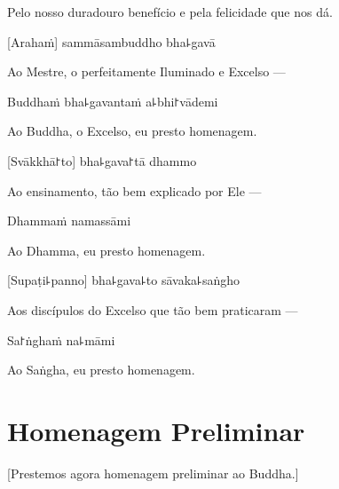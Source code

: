 \begin{english}
Pelo nosso duradouro benefício e pela felicidade que nos dá.
\end{english}

\clearpage

[Arahaṁ] sammāsambuddho bha꜕gavā

\begin{english}
Ao Mestre, o perfeitamente Iluminado e Excelso ---
\end{english}

Buddhaṁ bha꜕gavantaṁ a꜕bhi꜓vādemi

\begin{english}
  Ao Buddha, o Excelso, eu presto homenagem.
\end{english}

[Svākkhā꜓to] bha꜕gava꜓tā dhammo

\begin{english}
 Ao ensinamento, tão bem explicado por Ele ---
\end{english}

Dhammaṁ namassāmi

\begin{english}
  Ao Dhamma, eu presto homenagem.
\end{english}

[Supaṭi꜕panno] bha꜕gava꜕to sāvaka꜕saṅgho

\begin{english}
Aos discípulos do Excelso que tão bem praticaram ---
\end{english}

Sa꜓ṅghaṁ na꜕māmi

\begin{english}
  Ao Saṅgha, eu presto homenagem.
\end{english}

\chapter{Homenagem Preliminar}

\begin{leader}
\end{leader}

\begin{english}
  [Prestemos agora homenagem preliminar ao Buddha.]
\end{english}

\vspace{\baselineskip}

